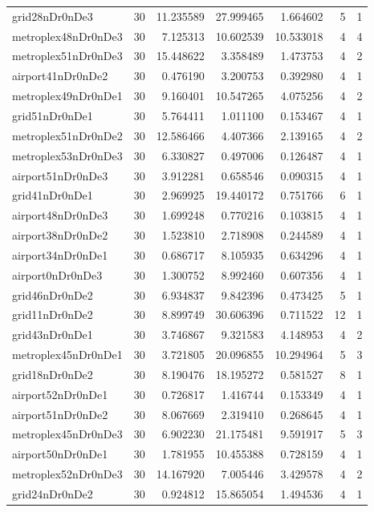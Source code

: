 \documentclass[../../../thesis.tex]{subfiles}
\begin{document}
\begin{longtable}{|l|r|r|r|r|r|r|}
grid28nDr0nDe3 & 30 & 11.235589 & 27.999465 & 1.664602 & 5 & 1 \\
metroplex48nDr0nDe3 & 30 & 7.125313 & 10.602539 & 10.533018 & 4 & 4 \\
metroplex51nDr0nDe3 & 30 & 15.448622 & 3.358489 & 1.473753 & 4 & 2 \\
airport41nDr0nDe2 & 30 & 0.476190 & 3.200753 & 0.392980 & 4 & 1 \\
metroplex49nDr0nDe1 & 30 & 9.160401 & 10.547265 & 4.075256 & 4 & 2 \\
grid51nDr0nDe1 & 30 & 5.764411 & 1.011100 & 0.153467 & 4 & 1 \\
metroplex51nDr0nDe2 & 30 & 12.586466 & 4.407366 & 2.139165 & 4 & 2 \\
metroplex53nDr0nDe3 & 30 & 6.330827 & 0.497006 & 0.126487 & 4 & 1 \\
airport51nDr0nDe3 & 30 & 3.912281 & 0.658546 & 0.090315 & 4 & 1 \\
grid41nDr0nDe1 & 30 & 2.969925 & 19.440172 & 0.751766 & 6 & 1 \\
airport48nDr0nDe3 & 30 & 1.699248 & 0.770216 & 0.103815 & 4 & 1 \\
airport38nDr0nDe2 & 30 & 1.523810 & 2.718908 & 0.244589 & 4 & 1 \\
airport34nDr0nDe1 & 30 & 0.686717 & 8.105935 & 0.634296 & 4 & 1 \\
airport0nDr0nDe3 & 30 & 1.300752 & 8.992460 & 0.607356 & 4 & 1 \\
grid46nDr0nDe2 & 30 & 6.934837 & 9.842396 & 0.473425 & 5 & 1 \\
grid11nDr0nDe2 & 30 & 8.899749 & 30.606396 & 0.711522 & 12 & 1 \\
grid43nDr0nDe1 & 30 & 3.746867 & 9.321583 & 4.148953 & 4 & 2 \\
metroplex45nDr0nDe1 & 30 & 3.721805 & 20.096855 & 10.294964 & 5 & 3 \\
grid18nDr0nDe2 & 30 & 8.190476 & 18.195272 & 0.581527 & 8 & 1 \\
airport52nDr0nDe1 & 30 & 0.726817 & 1.416744 & 0.153349 & 4 & 1 \\
airport51nDr0nDe2 & 30 & 8.067669 & 2.319410 & 0.268645 & 4 & 1 \\
metroplex45nDr0nDe3 & 30 & 6.902230 & 21.175481 & 9.591917 & 5 & 3 \\
airport50nDr0nDe1 & 30 & 1.781955 & 10.455388 & 0.728159 & 4 & 1 \\
metroplex52nDr0nDe3 & 30 & 14.167920 & 7.005446 & 3.429578 & 4 & 2 \\
grid24nDr0nDe2 & 30 & 0.924812 & 15.865054 & 1.494536 & 4 & 1 \\

\end{longtable}
\end{document}
